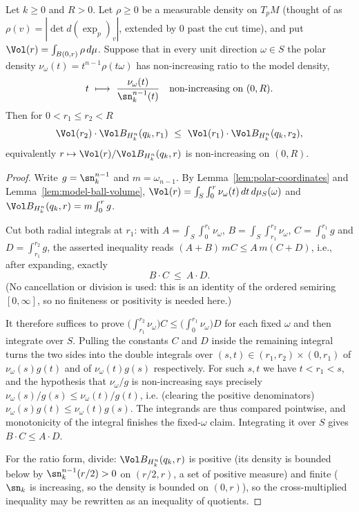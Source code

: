 \begin{lemma}
\label{lem:bishop-gromov-ball}
\leanok
Let $k\ge0$ and $R>0$. Let $\rho\ge0$ be a measurable density on $T_pM$ (thought of
as $\rho(v)=|\det d(\exp_p)_v|$, extended by $0$ past the cut time), and put
$\Vol(r)=\int_{B(0,r)}\rho\,d\mu$. Suppose that in every unit direction
$\omega\in S$ the polar density $\nu_\omega(t)=t^{n-1}\rho(t\omega)$ has
non-increasing ratio to the model density,
$$t\ \longmapsto\ \frac{\nu_\omega(t)}{\sn_k^{n-1}(t)}
\quad\text{non-increasing on }(0,R).$$
Then for $0<r_1\le r_2<R$
$$\Vol(r_2)\cdot\Vol B_{H^n_k}(q_k,r_1)\ \le\
\Vol(r_1)\cdot\Vol B_{H^n_k}(q_k,r_2),$$
equivalently $r\mapsto\Vol(r)/\Vol B_{H^n_k}(q_k,r)$ is non-increasing on $(0,R)$.
\end{lemma}

\begin{proof}
\leanok
Write $g=\sn_k^{n-1}$ and $m=\omega_{n-1}$. By
Lemma~\ref{lem:polar-coordinates} and Lemma~\ref{lem:model-ball-volume},
$\Vol(r)=\int_S\int_0^r\nu_\omega(t)\,dt\,d\mu_S(\omega)$ and
$\Vol B_{H^n_k}(q_k,r)=m\int_0^rg$.

Cut both radial integrals at $r_1$: with
$A=\int_S\int_0^{r_1}\nu_\omega$, $B=\int_S\int_{r_1}^{r_2}\nu_\omega$,
$C=\int_0^{r_1}g$ and $D=\int_{r_1}^{r_2}g$, the asserted inequality reads
$(A+B)\,mC\le A\,m(C+D)$, i.e., after expanding, exactly
$$B\cdot C\ \le\ A\cdot D.$$
(No cancellation or division is used: this is an identity of the ordered
semiring $[0,\infty]$, so no finiteness or positivity is needed here.)

It therefore suffices to prove $\bigl(\int_{r_1}^{r_2}\nu_\omega\bigr)C\le
\bigl(\int_0^{r_1}\nu_\omega\bigr)D$ for each fixed $\omega$ and then integrate
over $S$. Pulling the constants $C$ and $D$ inside the remaining integral turns
the two sides into the double integrals over
$(s,t)\in(r_1,r_2)\times(0,r_1)$ of $\nu_\omega(s)g(t)$ and of
$\nu_\omega(t)g(s)$ respectively. For such $s,t$ we have $t<r_1<s$, and the
hypothesis that $\nu_\omega/g$ is non-increasing says precisely
$\nu_\omega(s)/g(s)\le\nu_\omega(t)/g(t)$, i.e. (clearing the positive
denominators) $\nu_\omega(s)g(t)\le\nu_\omega(t)g(s)$. The integrands are thus
compared pointwise, and monotonicity of the integral finishes the fixed-$\omega$
claim. Integrating it over $S$ gives $B\cdot C\le A\cdot D$.

For the ratio form, divide: $\Vol B_{H^n_k}(q_k,r)$ is positive (its density is
bounded below by $\sn_k^{n-1}(r/2)>0$ on $(r/2,r)$, a set of positive measure) and
finite ($\sn_k$ is increasing, so the density is bounded on $(0,r)$), so the
cross-multiplied inequality may be rewritten as an inequality of quotients.
\end{proof}

